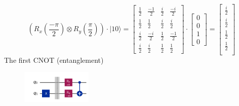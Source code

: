 \documentclass{article}
\begin{document}
\begin{itemize}
	      \[
		      \left(R_x(\frac{-\pi}{2}) \otimes R_y(\frac{\pi}{2})\right) \cdot |10 \rangle =
		      \begin{bmatrix}
			      \frac{1}{2} & \frac{-1}{2} & \frac{i}{2} & \frac{-i}{2} \\
			      \frac{1}{2} & \frac{1}{2}  & \frac{i}{2} & \frac{i}{2}  \\
			      \frac{i}{2} & \frac{-i}{2} & \frac{1}{2} & \frac{-1}{2} \\
			      \frac{i}{2} & \frac{i}{2}  & \frac{1}{2} & \frac{1}{2}
		      \end{bmatrix}
		      \cdot
		      \begin{bmatrix}
			      0 \\
			      0 \\
			      1 \\
			      0
		      \end{bmatrix}
		      =
		      \begin{bmatrix}
			      \frac{i}{2} \\
			      \frac{i}{2} \\
			      \frac{1}{2} \\
			      \frac{1}{2} \\
		      \end{bmatrix}
	      \]
	      The first CNOT (entanglement)
	      \begin{figure}[H]
		      \centering
		      \includegraphics[width=0.3\textwidth, height=0.15\textheight]{1cnot.png}


\end{figure}
\end{itemize}
\end{document}

